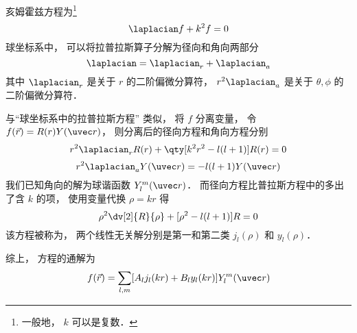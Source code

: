

亥姆霍兹方程为\footnote{一般地， $k$ 可以是复数．}
\begin{equation}
\laplacian f + k^2 f = 0
\end{equation}
球坐标系中， 可以将拉普拉斯算子分解为径向和角向两部分
\begin{equation}
\laplacian = \laplacian_r + \laplacian_{a}
\end{equation}
其中 $\laplacian_r$ 是关于 $r$ 的二阶偏微分算符， $r^2\laplacian_{a}$ 是关于 $\theta, \phi$ 的二阶偏微分算符．

与“球坐标系中的拉普拉斯方程”%
类似， 将 $f$ 分离变量， 令 $f(\vec r) = R(r) Y(\uvec r)$， 则分离后的径向方程和角向方程分别
\begin{equation}
r^2\laplacian_r R(r) + \qty[k^2 r^2 - l(l+1)] R(r) = 0
\end{equation}
\begin{equation}
r^2 \laplacian_{a} Y(\uvec r) = -l(l+1) Y(\uvec r)
\end{equation}
我们已知角向的解为球谐函数 $Y_l^m(\uvec r)$． 而径向方程比普拉斯方程中的多出了含 $k$ 的项， 使用变量代换 $\rho = kr$ 得
\begin{equation}
\rho^2\dv[2]{R}{\rho} + [\rho^2 - l(l+1)] R = 0
\end{equation}
该方程被称为， 两个线性无关解分别是第一和第二类 $j_l(\rho)$ 和 $y_l(\rho)$．%

综上， 方程的通解为
\begin{equation}
f(\vec r) = \sum_{l,m} [A_l j_l(kr) + B_l y_l(kr)] Y_l^m(\uvec r)
\end{equation}
